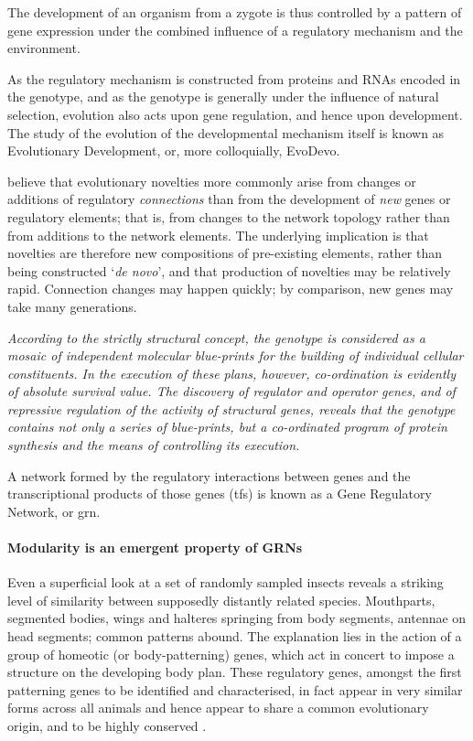 The development of an organism from a zygote is thus controlled by a pattern of gene expression under the combined influence of a regulatory mechanism and the environment.

As the regulatory mechanism is constructed from proteins and RNAs encoded in the genotype, and as the genotype is generally under the influence of natural selection, evolution also acts upon gene regulation, and hence upon development. The study of the evolution of the developmental mechanism itself is known as Evolutionary Development, or, more colloquially, EvoDevo.

\parencite{Prudhomme:2007ax} believe that evolutionary novelties more commonly arise from changes or additions of regulatory \emph{connections} than from the development of \emph{new} genes or regulatory elements; that is, from changes to the network topology rather than from additions to the network elements. The underlying implication is that novelties are therefore new compositions of
pre-existing elements, rather than being constructed `\emph{de novo}', and that production of novelties may be relatively rapid. Connection changes may happen quickly; by comparison, new genes may take many generations.

\begin{flushright}
	\emph{According to the strictly structural concept, the genotype is considered as a mosaic of independent molecular blue-prints for the building of individual cellular constituents. In the execution of these plans, however, co-ordination is evidently of absolute survival value. The discovery of regulator and operator genes, and of repressive regulation of the activity of structural genes, reveals that the genotype contains not only a series of blue-prints, but a co-ordinated program of protein synthesis and the means of controlling its execution.}
	\par\textcite[p354]{Jacob:1961ys}
\end{flushright}

A network formed by the regulatory interactions between genes and the transcriptional products of those genes (\glspl{tf}) is known as a Gene Regulatory Network, or \gls{grn}.

\paragraph{Modularity is an emergent property of GRNs}
Even a superficial look at a set of randomly sampled insects reveals a striking level of similarity between supposedly distantly related species. Mouthparts, segmented bodies, wings and halteres springing from body segments, antennae on head segments; common patterns abound. The explanation lies in the action of a group of homeotic (or body-patterning) genes, which act in concert to impose a structure on the developing body plan. These regulatory genes, amongst the first patterning genes to be identified and characterised, in fact appear in very similar forms across all animals and hence appear to share a common evolutionary origin, and to be highly conserved \parencite{Shubin:2009vw}. 


